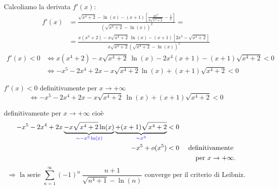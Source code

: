 \begin{exbar}
\begin{example}
	Calcoliamo la derivata $f'(x)$:
	\begin{align*}
		f'(x)
		&= \frac{\sqrt{x^4 + 2} - \ln(x) - (x + 1) \left[ \frac{4 x^3 } {2 \sqrt{x^4 + 2}} - \frac{1}{x} \right]} {\left( 
			\sqrt{x^4 + 2} - \ln(x) \right)^2} = 
		\\
		&= \frac{x (x^4 + 2) - x \sqrt{x^4 + 2} \ \ln(x) - (x + 1) \left[2x ^ 4 - \sqrt{x^4 + 2} \right] } {x \sqrt{x^4 + 2} \left( \sqrt{x^4 + 2} - \ln(x) \right)^2}
	\end{align*}
	\begin{align*}
		f'(x)<0 
		& \iff x (x^4 + 2) - x \sqrt{x^4 + 2} \ \ln(x) - 2x^4 (x + 1) - (x + 1) \sqrt{x^4 + 2}  < 0
		\\
		&\iff -x^5 - 2x^4 + 2x - x\sqrt{x^4+2} \ln(x) + (x + 1) \sqrt{x^4 + 2} < 0
	\end{align*}
	
		$f'(x) < 0$ definitivamente per $x \rightarrow +\infty$
	\begin{equation*}
		 \iff -x^5 - 2x^4 + 2x - x \sqrt{x^4 + 2} \ \ln(x) + (x+1) \sqrt{x^4 + 2} < 0
	\end{equation*} 
	
	definitivamente per $x\rightarrow +\infty$ cioè
	\begin{align*}
		-x^5 - 2x^4 + 2x \underbrace{- x\sqrt{x^4 + 2} \ln(x)}_{\color{blue}{\sim -x^3 \ln(x)}} \underbrace{+ (x + 1) \sqrt{x^4 + 2}}_{\color{blue}{\sim x^3}} &< 0 
		\\
		-x^5 + o(x^5) &< 0 &\text{ definitivamente } 
		\\
		& & \text{per } x\rightarrow +\infty.
	\end{align*}
	\begin{equation*}
		\Rightarrow \text{ la serie } \sum_{n=1}^{\infty} (-1)^n \ \frac{n+1} {\sqrt{n^4 + 1} - \ln(n)} \text{ converge per il criterio di Leibniz.}
	\end{equation*}
\end{example}
\end{exbar}

